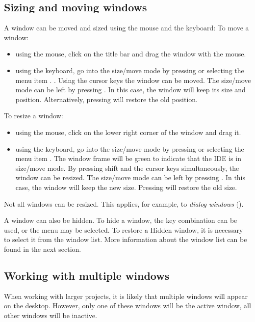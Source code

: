 \subsection{Sizing and moving windows}
\label{se:windowsizingmoving}
A window can be moved and sized using the mouse and the keyboard:
To move a window:
\begin{itemize}
\item using the mouse, click on the title bar and drag the window
with the mouse.
\item using the keyboard, go into the size/move mode
by pressing  or selecting the menu item
. . Using the cursor keys the window can be moved.
The size/move mode can be left by pressing .
In this case, the window will keep its size and position.
Alternatively, pressing  will restore the old position.
\end{itemize}
To resize a window:
\begin{itemize}
\item using the mouse, click on the lower right corner of the window
and drag it.
\item using the keyboard, go into the size/move mode
by pressing  or selecting the menu item
. The window frame will be green to indicate that
the IDE is in size/move mode.
By pressing shift and the cursor keys simultaneously, the window can
be resized.  The size/move mode can be left by pressing
. In this case, the window will keep the new size.
Pressing  will restore the old size.
\end{itemize}
Not all windows can be resized. This applies, for example, to
\emph{dialog windows} ().

A window can also be hidden. To hide a window, the  key
combination can be used, or the  menu may be selected.
To restore a Hidden window, it is necessary to select it from the window
list. More information about the window list can be found in the next
section.
%
%
\subsection{Working with multiple windows}
\label{se:multiplewindows}
When working with larger projects, it is likely that multiple windows
will appear on the desktop. However, only one of these windows will be
the active window, all other windows will be inactive.

